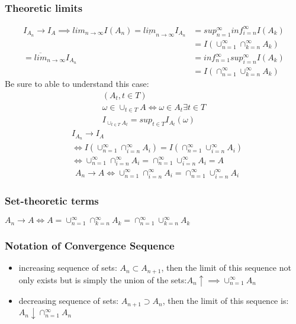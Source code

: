 \documentclass{article}
\theoremstyle{definition}
\theoremstyle{thrm}
\theoremstyle{lma}
\theoremstyle{ppst}
\theoremstyle{crlr}
\begin{document}
\subsubsection{Theoretic limits}
\begin{align*}
	I_{A_n}\to I_A \implies lim_{n \to \infty}I(A_n) =  \underline{lim}_{n \to \infty}I_{A_n} &=sup_{n=1}^\infty inf_{i=n}^\infty I(A_k)\\
	&= I(\cup_{n=1}^\infty \cap_{k=n}^\infty A_k)\\
	 =\overline{lim}_{n \to \infty}I_{A_n} &= inf_{n=1}^\infty sup_{i=n}^\infty I(A_k)\\
	 &= I(\cap_{n=1}^\infty \cup_{k=n}^\infty A_k)
\end{align*}
Be sure to able to understand this case:
\begin{align*}
	(A_t, t\in T)\\
	\omega \in \cup_{t\in T}A \iff \omega \in A_t \exists t \in T\\
	I_{\cup_{t\in T}A_t} =  sup_{t \in T} I_{A_t}(\omega)
\end{align*}
\begin{align*}
	&I_{A_n}\to I_A \\
	&\iff I(\cup_{n=1}^\infty \cap_{i=n}^\infty A_i) = I(\cap_{n=1}^\infty \cup_{i=n}^\infty A_i) \\
	&\iff \cup_{n=1}^\infty \cap_{i=n}^\infty A_i = \cap_{n=1}^\infty \cup_{i=n}^\infty A_i = A
\end{align*}
\begin{align*}
	&A_n \to A \iff \cup_{n=1}^\infty \cap_{i=n}^\infty A_i = \cap_{n=1}^\infty \cup_{i=n}^\infty A_i
\end{align*}

\subsubsection{Set-theoretic terms}
$A_n \to A \iff A = \cup_{n=1}^\infty \cap_{k=n}^\infty A_k = \cap_{n=1}^\infty \cup_{k=n}^\infty A_k$
\subsubsection{Notation of Convergence Sequence}
\begin{itemize}
	\item increasing sequence of sets: $A_n \subset A_{n+1}$, then the limit of this sequence not only exists but is simply the union of the sets:$A_n \uparrow \implies \cup_{n=1}^\infty A_n$
	\item decreasing sequence of sets: $A_{n+1} \supset A_n$, then the limit of this sequence is: $A_n \downarrow \cap_{n=1}^\infty A_n$
\end{itemize}
\end{document}

